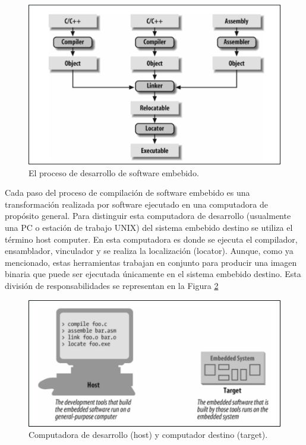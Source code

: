 \documentclass[output=paper, 
colorlinks,
citecolor=brown,
newtxmath
]{langscibook}
\begin{document}
\begin{figure}
\includegraphics[width=\linewidth]{images/ciclo_de_compilacion.png}
\caption{El proceso de desarrollo de software embebido.}
\label{fig:compilacion}
\end{figure}



Cada paso del proceso de compilación de software embebido
es una transformación realizada por software ejecutado en una computadora
de propósito general. Para distinguir esta computadora de desarrollo (usualmente una 
PC o estación de trabajo UNIX) del sistema embebido destino se utiliza el término host computer.
En esta computadora es donde se ejecuta el compilador, ensamblador, vinculador y se realiza la localización (locator).
Aunque, como ya mencionado, estas herramientas trabajan en conjunto
para producir una imagen binaria que puede ser ejecutada
únicamente en el sistema embebido destino. Esta división de responsabilidades
se representan en la Figura \ref{fig:compilacion2}

\begin{figure}
\includegraphics[width=\linewidth]{images/host_target.png}
\caption{Computadora de desarrollo (host) y computador destino (target).}
\label{fig:compilacion2}
\end{figure}
\end{document}
